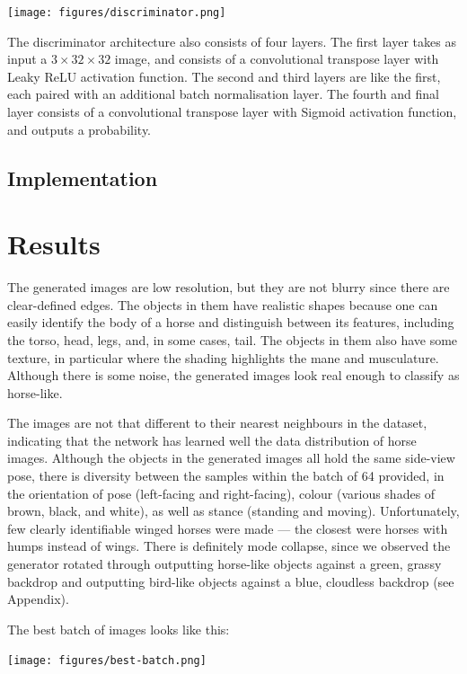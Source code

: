 \documentclass{article}
\begin{document}
\begin{center}
    \texttt{[image: figures/discriminator.png]}
\end{center}

The discriminator architecture also consists of four layers. The first layer takes as input a $3 \times 32 \times 32$ image, and consists of a convolutional transpose layer with Leaky ReLU activation function. The second and third layers are like the first, each paired with an additional batch normalisation layer. The fourth and final layer consists of a convolutional transpose layer with Sigmoid activation function, and outputs a probability. 

\subsection{Implementation}

\section{Results}
The generated images are low resolution, but they are not blurry since there are clear-defined edges. The objects in them have realistic shapes because one can easily identify the body of a horse and distinguish between its features, including the torso, head, legs, and, in some cases, tail. The objects in them also have some texture, in particular where the shading highlights the mane and musculature. Although there is some noise, the generated images look real enough to classify as horse-like. 

The images are not that different to their nearest neighbours in the dataset, indicating that the network has learned well the data distribution of horse images. Although the objects in the generated images all hold the same side-view pose, there is diversity between the samples within the batch of 64 provided, in the orientation of pose (left-facing and right-facing), colour (various shades of brown, black, and white), as well as stance (standing and moving). Unfortunately, few clearly identifiable winged horses were made --- the closest were horses with humps instead of wings. There is definitely mode collapse, since we observed the generator rotated through outputting horse-like objects against a green, grassy backdrop and outputting bird-like objects against a blue, cloudless backdrop (see Appendix). 

The best batch of images looks like this:
\begin{center}
    \texttt{[image: figures/best-batch.png]}
\end{center}
\end{document}
